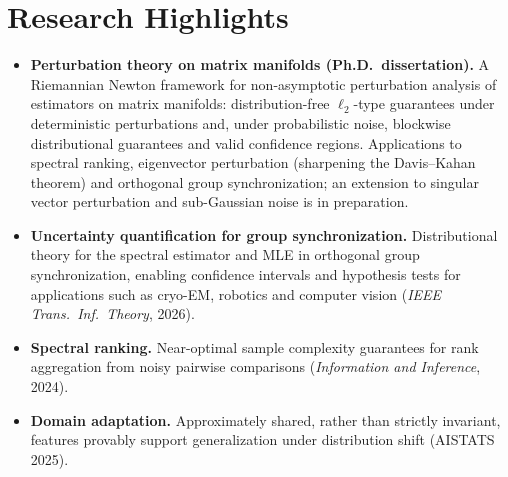 \documentclass[letterpaper,11pt]{article}
\begin{document}
\section*{Research Highlights}
\begin{itemize}
  \item \textbf{Perturbation theory on matrix manifolds (Ph.D.\ dissertation).} A Riemannian Newton framework for non-asymptotic perturbation analysis of estimators on matrix manifolds: distribution-free $\ell_2$-type guarantees under deterministic perturbations and, under probabilistic noise, blockwise distributional guarantees and valid confidence regions. Applications to spectral ranking, eigenvector perturbation (sharpening the Davis--Kahan theorem) and orthogonal group synchronization; an extension to singular vector perturbation and sub-Gaussian noise is in preparation.
  \item \textbf{Uncertainty quantification for group synchronization.} Distributional theory for the spectral estimator and MLE in orthogonal group synchronization, enabling confidence intervals and hypothesis tests for applications such as cryo-EM, robotics and computer vision (\textit{IEEE Trans.\ Inf.\ Theory}, 2026).
  \item \textbf{Spectral ranking.} Near-optimal sample complexity guarantees for rank aggregation from noisy pairwise comparisons (\textit{Information and Inference}, 2024).
  \item \textbf{Domain adaptation.} Approximately shared, rather than strictly invariant, features provably support generalization under distribution shift (AISTATS 2025).
\end{itemize}
\end{document}
